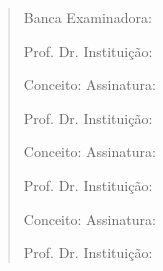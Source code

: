 \documentclass[12pt,twoside,a4paper]{book}
\begin{document}
    \begin{quote}
    \begin{center}
    \begin{Large}
    Banca Examinadora:
    \end{Large}
    \vspace{1cm}
    \end{center}
    
    Prof. Dr. \underline{\hspace{5cm}} \hspace{1cm} Instituição: \underline{\hspace{5cm}}
    
    \vspace{0.5cm}
    
    Conceito: \underline{\hspace{5cm}} \hspace{1cm} Assinatura: \underline{\hspace{5.2cm}}
    
    \vspace{1cm}
    
    Prof. Dr. \underline{\hspace{5cm}} \hspace{1cm} Instituição: \underline{\hspace{5cm}}
    
    \vspace{0.5cm}
    
    Conceito: \underline{\hspace{5cm}} \hspace{1cm} Assinatura: \underline{\hspace{5.2cm}}
    
    \vspace{1cm}
    
    Prof. Dr. \underline{\hspace{5cm}} \hspace{1cm} Instituição: \underline{\hspace{5cm}}
    
    \vspace{0.5cm}
    
    Conceito: \underline{\hspace{5cm}} \hspace{1cm} Assinatura: \underline{\hspace{5.2cm}}
    
    \vspace{1cm}
    
    Prof. Dr. \underline{\hspace{5cm}} \hspace{1cm} Instituição: \underline{\hspace{5cm}}
    

\end{quote}
\end{document}
